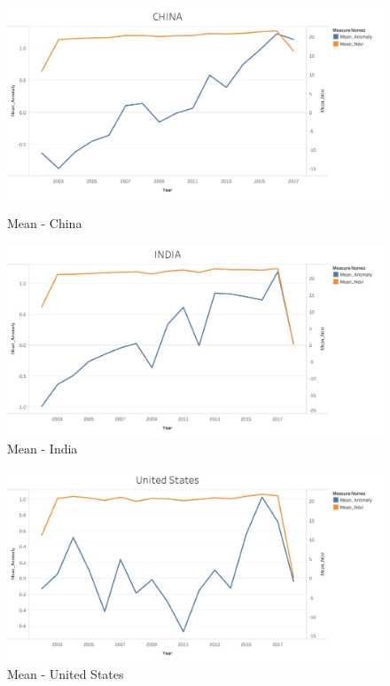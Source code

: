 \begin{itemize}
     \begin{figure}[!htb]
        \begin{minipage}{0.5\textwidth}
            \centering
            \includegraphics[width=1.0\linewidth]{figures/ch5/Mean/CHINA_mean.png}
            \caption{Mean - China}\label{Fig:CHINA_mean}
        \end{minipage}\hfill
        \begin{minipage}{0.5\textwidth}
            \centering
            \includegraphics[width=1.0\linewidth]{figures/ch5/Mean/INDIA_mean.png}
            \caption{Mean - India}\label{Fig:INDIA_mean}
        \end{minipage}
    \end{figure}
    
     \begin{figure}[H]
            \centering
            \includegraphics[width=0.5\linewidth]{figures/ch5/Mean/US_mean.png}
            \caption{\label{fig:US_mean}Mean - United States}
    \end{figure}


\end{itemize}
